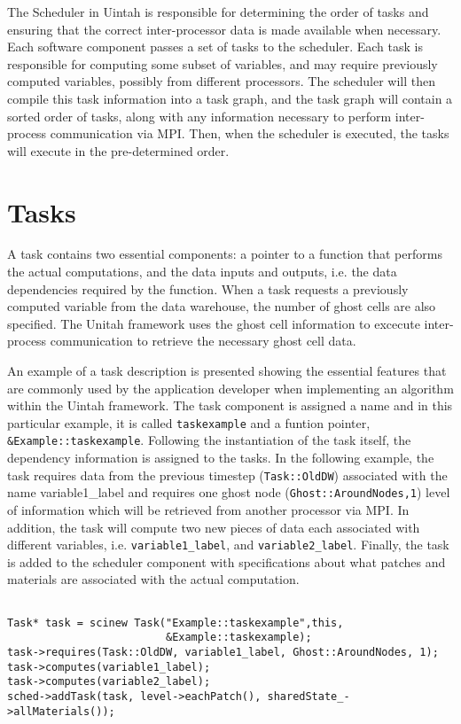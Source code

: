 \documentclass[12pt]{report}
\begin{document}
The Scheduler in Uintah is responsible for determining the order of
tasks and ensuring that the correct inter-processor data is made
available when necessary. Each software component passes a set of
tasks to the scheduler. Each task is responsible for computing some
subset of variables, and may require previously computed variables,
possibly from different processors. The scheduler will then compile
this task information into a task graph, and the task graph will
contain a sorted order of tasks, along with any information necessary
to perform inter-process communication via MPI. Then, when the
scheduler is executed, the tasks will execute in the pre-determined
order.

\section{Tasks}

A task contains two essential components: a pointer to a function
that performs the actual computations, and the data inputs and
outputs, i.e. the data dependencies required by the function.  When a
task requests a previously computed variable from the data warehouse,
the number of ghost cells are also specified.  The Unitah framework
uses the ghost cell information to excecute inter-process
communication to retrieve the necessary ghost cell data.

An example of a task description is presented showing the essential
features that are commonly used by the application developer when
implementing an algorithm within the Uintah framework.  The task
component is assigned a name and in this particular example, it is
called \texttt{taskexample} and a funtion pointer,
\texttt{\&Example::taskexample}.  Following the instantiation of the
task itself, the dependency information is assigned to the tasks.  In
the following example, the task requires data from the previous
timestep (\texttt{Task::OldDW}) associated with the name
variable1\_label and requires one ghost node
(\texttt{Ghost::AroundNodes,1}) level of information which will be
retrieved from another processor via MPI.  In addition, the task will
compute two new pieces of data each associated with different
variables, i.e. \texttt{variable1\_label}, and
\texttt{variable2\_label}.  Finally, the task is added to the scheduler
component with specifications about what patches and materials are
associated with the actual computation.

\begin{verbatim}

Task* task = scinew Task("Example::taskexample",this,
                         &Example::taskexample);
task->requires(Task::OldDW, variable1_label, Ghost::AroundNodes, 1);
task->computes(variable1_label);
task->computes(variable2_label);
sched->addTask(task, level->eachPatch(), sharedState_->allMaterials());

\end{verbatim}
\end{document}
